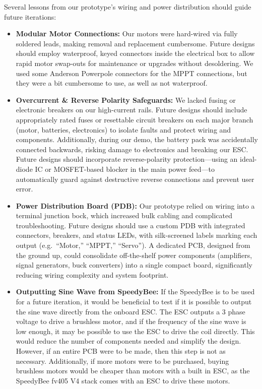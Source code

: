 Several lessons from our prototype's wiring and power distribution should guide future iterations:
\begin{itemize}
  \item \textbf{Modular Motor Connections:} 
    Our motors were hard-wired via fully soldered leads, making removal and replacement cumbersome. Future designs should employ waterproof, keyed connectors inside the electrical box to allow rapid motor swap-outs for maintenance or upgrades without desoldering. We used some Anderson Powerpole connectors for the MPPT connections, but they were a bit cumbersome to use, as well as not waterproof. 
  \item \textbf{Overcurrent \& Reverse Polarity Safeguards:} 
    We lacked fusing or electronic breakers on our high-current rails. Future designs should include appropriately rated fuses or resettable circuit breakers on each major branch (motor, batteries, electronics) to isolate faults and protect wiring and components.
    Additionally, during our demo, the battery pack was accidentally connected backwards, risking damage to electronics and breaking our ESC. Future designs should incorporate reverse-polarity protection—using an ideal-diode IC or MOSFET-based blocker in the main power feed—to automatically guard against destructive reverse connections and prevent user error.
  \item \textbf{Power Distribution Board (PDB):} 
    Our prototype relied on wiring into a terminal junction bock, which increased bulk cabling and complicated troubleshooting. Future designs should use a custom PDB with integrated connectors, breakers, and status LEDs, with silk-screened labels marking each output (e.g.\ “Motor,” “MPPT,” “Servo”). A dedicated PCB, designed from the ground up, could consolidate off-the-shelf power components (amplifiers, signal generators, buck converters) into a single compact board, significantly reducing wiring complexity and system footprint.
  \item \textbf{Outputting Sine Wave from SpeedyBee:}
    If the SpeedyBee is to be used for a future iteration, it would be beneficial to test if it is possible to output the sine wave directly from the onboard ESC. The ESC outputs a 3 phase voltage to drive a brushless motor, and if the frequency of the sine wave is low enough, it may be possible to use the ESC to drive the coil directly. This would reduce the number of components needed and simplify the design. However, if an entire PCB were to be made, then this step is not as necessary. Additionally, if more motors were to be purchased, buying brushless motors would be cheaper than motors with a built in ESC, as the SpeedyBee fv405 V4 stack comes with an ESC to drive these motors. 

\end{itemize}
